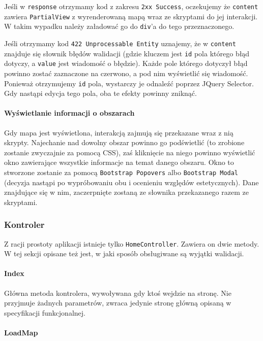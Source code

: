 \documentclass[a4paper, 10pt, titlepage]{article}
\newcommand{\code}[1]{\texttt{#1}}
\begin{document}
Jeśli w \code{response} otrzymamy kod z zakresu \code{2xx Success}, oczekujemy że \code{content} zawiera \code{PartialView} z wyrenderowaną mapą wraz ze skryptami do jej interakcji.
W takim wypadku należy załadować go do \code{div}'a do tego przeznaczonego.

Jeśli otrzymamy kod \code{422 Unprocessable Entity} uznajemy, że w \code{content} znajduje się słownik błędów walidacji (gdzie kluczem jest \code{id} pola którego błąd dotyczy, a \code{value} jest wiadomość o błędzie).
Każde pole którego dotyczył błąd powinno zostać zaznaczone na czerwono, a pod nim wyświetlić się wiadomość.
Ponieważ otrzymujemy \code{id} pola, wystarczy je odnaleźć poprzez JQuery Selector.
Gdy nastąpi edycja tego pola, oba te efekty powinny zniknąć.

\paragraph{Wyświetlanie informacji o obszarach}

Gdy mapa jest wyświetlona, interakcją zajmują się przekazane wraz z nią skrypty.
Najechanie nad dowolny obszar powinno go podświetlić (to zrobione zostanie zwyczajnie za pomocą CSS), zaś kliknięcie na niego powinno wyświetlić okno zawierające wszystkie informacje na temat danego obszaru.
Okno to stworzone zostanie za pomocą \code{Bootstrap Popovers} albo \code{Bootstrap Modal} (decyzja nastąpi po wypróbowaniu obu i ocenieniu względów estetycznych).
Dane znajdujące się w nim, zaczerpnięte zostaną ze słownika przekazanego razem ze skryptami.

\subsubsection{Kontroler}

Z racji prostoty aplikacji istnieje tylko \code{HomeController}.
Zawiera on dwie metody.
W tej sekcji opisane też jest, w jaki sposób obsługiwane są wyjątki walidacji.

\paragraph{Index}

Główna metoda kontrolera, wywoływana gdy ktoś wejdzie na stronę.
Nie przyjmuje żadnych parametrów, zwraca jedynie stronę główną opisaną w specyfikacji funkcjonalnej.

\paragraph{LoadMap}
\end{document}
